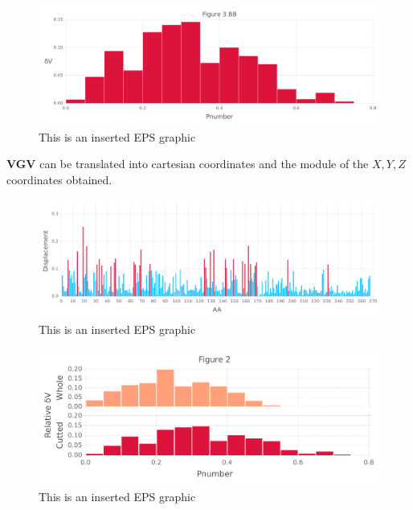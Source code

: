 \documentclass[10pt,letterpaper]{article}
\begin{document}
\begin{figure}[ht]
\begin{center}
\includegraphics[scale=0.5]{1xkk/3bbfigure_hi-precision.pdf}
\caption{This is an inserted EPS graphic}
\label{fig11}
\end{center}
\end{figure}

\FloatBarrier


\textbf{VGV} can be translated into cartesian coordinates and the module of the \(X, Y, Z\) coordinates obtained.

\begin{figure}[ht]
\begin{center}
\includegraphics[scale=0.5]{1xkk/5figure_hi-precision.pdf}
\caption{This is an inserted EPS graphic}
\label{fig13}
\end{center}
\end{figure}

\begin{figure}[ht]
\begin{center}
\includegraphics[scale=0.5]{1xkk/3_both_hi-precision.pdf}
\caption{This is an inserted EPS graphic}
\label{fig13}
\end{center}
\end{figure}
\end{document}
